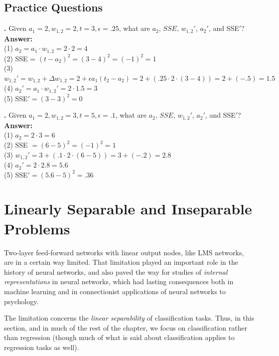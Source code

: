 \subsection{Practice Questions}


\noindent
{}
{\bf \theLMSCounter.}  Given $a_1 = 2 ,w_{1,2} = 2 ,t = 3 ,\epsilon = .25$, what are $a_2$, $SSE$, $w_{1,2}'$, $a_2'$, and SSE$'$? \\
{\bf Answer:}  \\
(1) $a_2 = a_1 \cdot w_{1,2} = 2 \cdot 2 = 4$ \\
(2) SSE = $(t-a_2)^2 = (3-4)^2 = (-1)^2 = 1$ \\
(3) $w_{1,2}' = w_{1,2} + \Delta w_{1,2}  = 2 +  \epsilon a_1 (t_2 - a_2) = 2 + (.25 \cdot 2 \cdot (3 - 4)) = 2+(-.5) = 1.5$\\
(4) $a_2' =  a_1 \cdot w_{1,2}' = 2 \cdot 1.5 = 3$ \\
(5) SSE$' = (3-3)^2 = 0$
\bigskip

\noindent
{}
{\bf \theLMSCounter.}  Given $a_1 = 2 ,w_{1,2} = 3, t = 5 ,\epsilon = .1$, what are $a_2$, $SSE$, $w_{1,2}'$, $a_2'$, and SSE$'$? \\
{\bf Answer:} \\
(1) $a_2 = 2 \cdot 3 = 6$ \\
(2) SSE $= (6-5)^2 = (-1)^2 = 1$ \\
(3) $w_{1,2}' = 3 + (.1 \cdot 2 \cdot (6-5)) = 3 + (-.2) = 2.8$ \\
(4) $a_2' = 2 \cdot 2.8= 5.6$ \\
(5) SSE$' = (5.6-5)^2 = .36$
\bigskip

\section{Linearly Separable and Inseparable Problems}
\label{linearlySeparable}


Two-layer feed-forward networks with linear output nodes, like LMS networks, are in a certain way limited. That limitation played  an important role in the history of neural networks, and also paved the way for studies of \emph{internal representations} in neural networks, which had lasting consequences both in machine learning and in connectionist applications of neural networks to psychology. 

The limitation concerns the \emph{linear separability} of classification tasks. Thus, in this section, and in much of the rest of the chapter, we focus on classification rather than regression (though much of what is said about classification applies to regression tasks as well).

